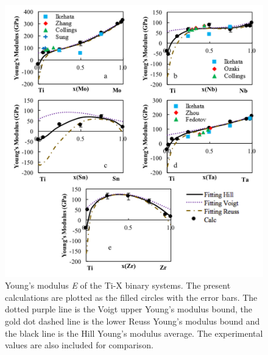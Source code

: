 \pagebreak
\begin{figure}[H]
	\centering
	\includegraphics[width=\textwidth]{Chapter-5/Figures/tixyoungs.png}
	\caption{Young's modulus \textit{E} of the Ti-X binary systems. The present calculations are plotted as the filled circles with the error bars. The dotted purple line is the Voigt upper Young's modulus bound, the gold dot dashed line is the lower Reuss Young's modulus bound and the black line is the Hill Young's modulus average. The experimental values \cite{Ikehata2004,Zhang2015,Boyer1994,Sung2015,Ozaki2004,Fedotov1985,Zhou2009a,Zhou2004a,Friak2012,Wu2010a} are also included for comparison. }
	\label{Ch5-figure:tixyoungs}
\end{figure}

